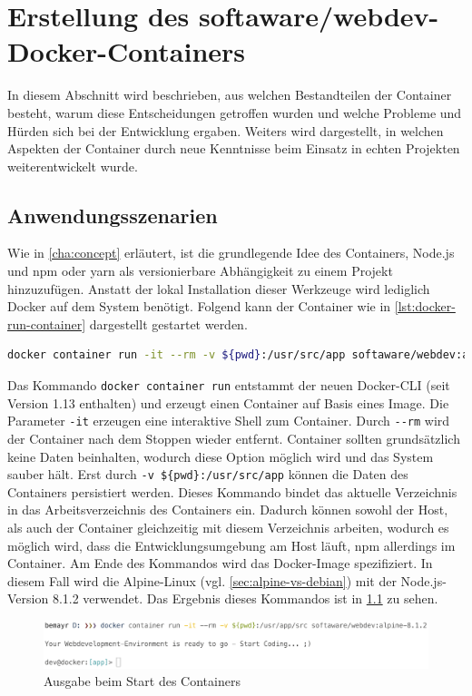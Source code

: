 \chapter{Erstellung des softaware/webdev-Docker-Containers}
\label{cha:implementation}
In diesem Abschnitt wird beschrieben, aus welchen Bestandteilen der Container besteht, warum diese Entscheidungen getroffen wurden und welche Probleme und Hürden sich bei der Entwicklung ergaben.
Weiters wird dargestellt, in welchen Aspekten der Container durch neue Kenntnisse beim Einsatz in echten Projekten weiterentwickelt wurde.

\section{Anwendungsszenarien}
Wie in \cref{cha:concept} erläutert, ist die grundlegende Idee des Containers, Node.js und npm oder yarn als versionierbare Abhängigkeit zu einem Projekt hinzuzufügen.
Anstatt der lokal Installation dieser Werkzeuge wird lediglich Docker auf dem System benötigt.
Folgend kann der Container wie in \cref{lst:docker-run-container} dargestellt gestartet werden.
\begin{lstlisting}[caption=Kommando zum Starten des softaware/webdev-Containers, language=bash, label=lst:docker-run-container]
docker container run -it --rm -v ${pwd}:/usr/src/app softaware/webdev:alpine-8.1.2
\end{lstlisting}
Das Kommando \verb|docker container run| entstammt der neuen Docker-CLI (seit Version 1.13 enthalten) und erzeugt einen Container auf Basis eines Image.
Die Parameter \verb|-it| erzeugen eine interaktive Shell zum Container.
Durch \verb|--rm| wird der Container nach dem Stoppen wieder entfernt.
Container sollten grundsätzlich keine Daten beinhalten, wodurch diese Option möglich wird und das System sauber hält.
Erst durch \verb|-v ${pwd}:/usr/src/app| können die Daten des Containers persistiert werden.
Dieses Kommando bindet das aktuelle Verzeichnis in das Arbeitsverzeichnis des Containers ein.
Dadurch können sowohl der Host, als auch der Container gleichzeitig mit diesem Verzeichnis arbeiten, wodurch es möglich wird, dass die Entwicklungsumgebung am Host läuft, npm allerdings im Container.
Am Ende des Kommandos wird das Docker-Image spezifiziert.
In diesem Fall wird die Alpine-Linux (vgl. \cref{sec:alpine-vs-debian}) mit der Node.js-Version 8.1.2 verwendet.
Das Ergebnis dieses Kommandos ist in \cref{fig:container-execution} zu sehen.
\begin{figure}[htbp]
    \centering
    \includegraphics[width=0.95\linewidth,clip]{images/container-execution}
    \caption{Ausgabe beim Start des Containers}
\label{fig:container-execution}
\end{figure}

